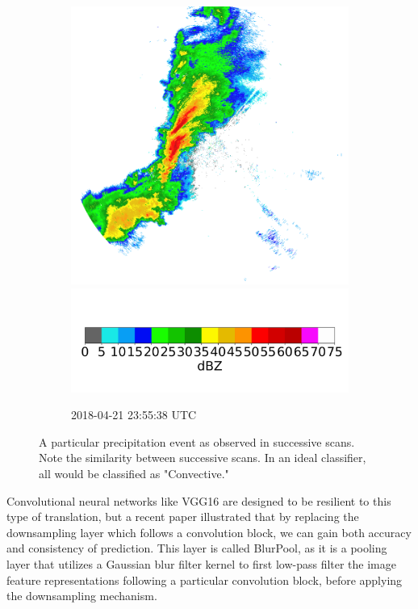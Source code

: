 \begin{figure}[h]
\begin{subfigure}[b]{0.3\textwidth}
		\includegraphics[width=\textwidth]{./thesis_code/plots/midlothian.tx-20180421-235538-ref.png}
		\includegraphics[width=\textwidth]{./thesis_code/plots/dfw_colormap.png}
		\caption{2018-04-21 23:55:38 UTC}
		\label{fig:bestmodel_translation6}
	\end{subfigure}
	\caption{A particular precipitation event as observed in successive scans. Note the similarity between successive scans. In an ideal classifier, all would be classified as "Convective."}
	\label{fig:bestmodel_translation}
\end{figure}

Convolutional neural networks like VGG16 are designed to be resilient to this type of translation, but a recent paper \cite{zhang2019making} illustrated that by replacing the downsampling layer which follows a convolution block, we can gain both accuracy and consistency of prediction.
This layer is called BlurPool, as it is a pooling layer that utilizes a Gaussian blur filter kernel to first low-pass filter the image feature representations following a particular convolution block, before applying the downsampling mechanism.

